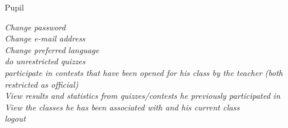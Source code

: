 \begin{section}{Pupil}

    \textit{Change password}\\
    \textit{Change e-mail address}\\
    \textit{Change preferred language}\\
    \textit{do unrestricted quizzes}\\
    \textit{participate in contests that have been opened for his class by the teacher (both restricted as official)}\\
    \textit{View results and statistics from quizzes/contests he previously participated in}\\
    \textit{View the classes he has been associated with and his current class}\\
	\textit{logout}

\end{section}